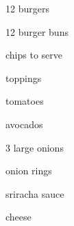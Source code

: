 \begin{ingredient}
    \begin{main}
        \item 12 burgers
        \item 12 burger buns
        \item chips to serve
    \end{main}
    \begin{subingredient}{toppings}
        \item tomatoes
        \item avocados
        \item 3 large onions
        \item onion rings
        \item sriracha sauce
        \item cheese
    \end{subingredient}
\end{ingredient}
\begin{recipe}
\end{recipe}
